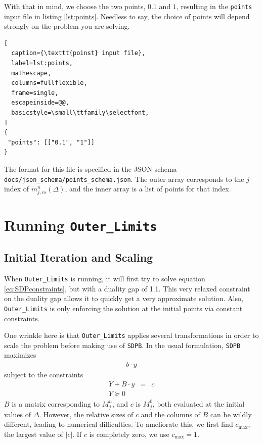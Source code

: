 \documentclass[12pt]{article}
\numberwithin{equation}{section}
\begin{document}
With that in mind, we choose the two points, $0.1$ and $1$,
resulting in the \texttt{points} input file in listing \ref{lst:points}.
Needless to say, the choice of points will depend strongly on the
problem you are solving.

\begin{lstlisting}[
  caption={\texttt{poinst} input file},
  label=lst:points,
  mathescape,
  columns=fullflexible,
  frame=single,
  escapeinside=@@,
  basicstyle=\small\ttfamily\selectfont,
]
{
 "points": [["0.1", "1"]]
}
\end{lstlisting}

The format for this file is specified in the JSON schema
\texttt{docs/json\_schema/points\_schema.json}. The outer array corresponds to the
$j$ index of $m_{j,rs}^{n}(\Delta)$, and the inner array is a list
of points for that index.

\section{Running \texttt{Outer\_Limits}}
\label{sec:running}

\subsection{Initial Iteration and Scaling}
\label{subsec:initial}

When \texttt{Outer\_Limits} is running, it will first try to solve
equation \ref{eq:SDPconstraints}, but with a duality gap of 1.1.  This
very relaxed constraint on the duality gap allows it to quickly get a
very approximate solution.  Also, \texttt{Outer\_Limits} is only
enforcing the solution at the initial points via constant constraints.

One wrinkle here is that \texttt{Outer\_Limits} applies several
transformations in order to scale the problem before making use of
\texttt{SDPB}.  In the usual formulation, \texttt{SDPB} maximizes
\begin{eqnarray}
  b\cdot y
  \label{eq:bdy}
\end{eqnarray}
subject to the constraints
\begin{eqnarray}
  Y + B\cdot y & = & c\\
  \label{eq:YByc}
  Y \succeq 0
  \label{eq:Ysucceq0}
\end{eqnarray}
$B$ is a matrix corresponding to $M^n_j$, and $c$ is $M^0_j$, both evaluated
at the initial values of $\Delta$.  However, the relative sizes
of $c$ and the columns of $B$ can be wildly different, leading to
numerical difficulties.  To ameliorate this, we first find $c_{\max}$,
the largest value of $|c|$.  If $c$ is completely zero, we use
$c_{\max}=1$.
\end{document}
